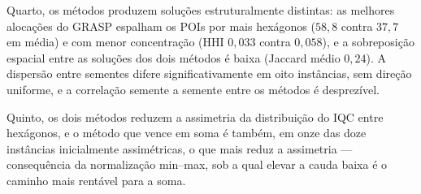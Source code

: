 \documentclass[11pt,a4paper]{article}
\begin{document}
Quarto, os métodos produzem soluções estruturalmente distintas: as melhores alocações do GRASP espalham os POIs por mais hexágonos ($58{,}8$ contra $37{,}7$ em média) e com menor concentração (HHI $0{,}033$ contra $0{,}058$), e a sobreposição espacial entre as soluções dos dois métodos é baixa (Jaccard médio $0{,}24$). A dispersão entre sementes difere significativamente em oito instâncias, sem direção uniforme, e a correlação semente a semente entre os métodos é desprezível.

Quinto, os dois métodos reduzem a assimetria da distribuição do IQC entre hexágonos, e o método que vence em soma é também, em onze das doze instâncias inicialmente assimétricas, o que mais reduz a assimetria — consequência da normalização min--max, sob a qual elevar a cauda baixa é o caminho mais rentável para a soma.
\end{document}
